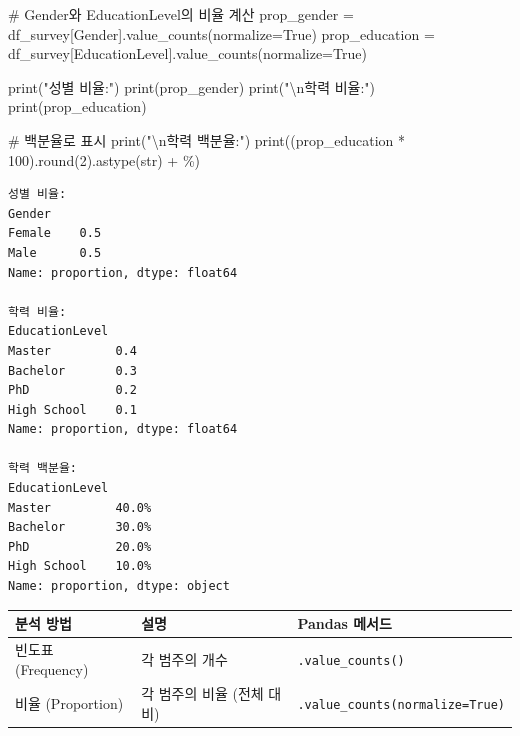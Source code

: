 \documentclass[
  letterpaper,
]{book}
\newenvironment{Shaded}{\begin{snugshade}}{\end{snugshade}}
\newcommand{\BuiltInTok}[1]{\textcolor[rgb]{0.00,0.23,0.31}{#1}}
\newcommand{\CharTok}[1]{\textcolor[rgb]{0.13,0.47,0.30}{#1}}
\newcommand{\CommentTok}[1]{\textcolor[rgb]{0.37,0.37,0.37}{#1}}
\newcommand{\DecValTok}[1]{\textcolor[rgb]{0.68,0.00,0.00}{#1}}
\newcommand{\NormalTok}[1]{\textcolor[rgb]{0.00,0.23,0.31}{#1}}
\newcommand{\OperatorTok}[1]{\textcolor[rgb]{0.37,0.37,0.37}{#1}}
\newcommand{\StringTok}[1]{\textcolor[rgb]{0.13,0.47,0.30}{#1}}
\newcommand{\VariableTok}[1]{\textcolor[rgb]{0.07,0.07,0.07}{#1}}
\begin{document}
\begin{Shaded}
\begin{Highlighting}[]
    \CommentTok{\# Gender와 EducationLevel의 비율 계산}
\NormalTok{    prop\_gender }\OperatorTok{=}\NormalTok{ df\_survey[}\StringTok{\textquotesingle{}Gender\textquotesingle{}}\NormalTok{].value\_counts(normalize}\OperatorTok{=}\VariableTok{True}\NormalTok{)}
\NormalTok{    prop\_education }\OperatorTok{=}\NormalTok{ df\_survey[}\StringTok{\textquotesingle{}EducationLevel\textquotesingle{}}\NormalTok{].value\_counts(normalize}\OperatorTok{=}\VariableTok{True}\NormalTok{)}

    \BuiltInTok{print}\NormalTok{(}\StringTok{"성별 비율:"}\NormalTok{)}
    \BuiltInTok{print}\NormalTok{(prop\_gender)}
    \BuiltInTok{print}\NormalTok{(}\StringTok{"}\CharTok{\textbackslash{}n}\StringTok{학력 비율:"}\NormalTok{)}
    \BuiltInTok{print}\NormalTok{(prop\_education)}

    \CommentTok{\# 백분율로 표시}
    \BuiltInTok{print}\NormalTok{(}\StringTok{"}\CharTok{\textbackslash{}n}\StringTok{학력 백분율:"}\NormalTok{)}
    \BuiltInTok{print}\NormalTok{((prop\_education }\OperatorTok{*} \DecValTok{100}\NormalTok{).}\BuiltInTok{round}\NormalTok{(}\DecValTok{2}\NormalTok{).astype(}\BuiltInTok{str}\NormalTok{) }\OperatorTok{+} \StringTok{\textquotesingle{}\%\textquotesingle{}}\NormalTok{)}
\end{Highlighting}
\end{Shaded}

\begin{verbatim}
성별 비율:
Gender
Female    0.5
Male      0.5
Name: proportion, dtype: float64

학력 비율:
EducationLevel
Master         0.4
Bachelor       0.3
PhD            0.2
High School    0.1
Name: proportion, dtype: float64

학력 백분율:
EducationLevel
Master         40.0%
Bachelor       30.0%
PhD            20.0%
High School    10.0%
Name: proportion, dtype: object
\end{verbatim}

\begin{longtable}[]{@{}
  >{\raggedright\arraybackslash}p{}
  >{\raggedright\arraybackslash}p{}
  >{\raggedright\arraybackslash}p{}@{}}
\toprule\noalign{}
\begin{minipage}[b]{\linewidth}\raggedright
분석 방법
\end{minipage} & \begin{minipage}[b]{\linewidth}\raggedright
설명
\end{minipage} & \begin{minipage}[b]{\linewidth}\raggedright
Pandas 메서드
\end{minipage} \\
\midrule\noalign{}
\endhead
\bottomrule\noalign{}
\endlastfoot
빈도표 (Frequency) & 각 범주의 개수 & \texttt{.value\_counts()} \\
비율 (Proportion) & 각 범주의 비율 (전체 대비) &
\texttt{.value\_counts(normalize=True)} \\
\end{longtable}
\end{document}
